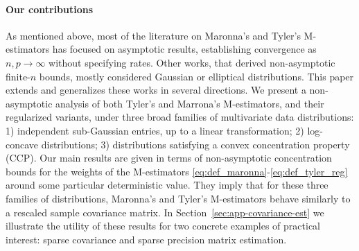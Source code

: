 \documentclass[times,sort&compress,3p]{elsarticle}
\newcommand{\Revision}[1]{{#1}}
\begin{document}
\paragraph{Our contributions}
As mentioned above, 
most of the literature on Maronna's and Tyler's M-estimators has focused on asymptotic results,  establishing convergence as $n,p\to\infty$
without specifying rates.
Other works,
that derived non-asymptotic finite-$n$ bounds,  mostly considered Gaussian or elliptical distributions. 
This paper extends and
generalizes these works in several directions. 
We present a non-asymptotic analysis of both Tyler's and Marrona's M-estimators, and their regularized variants, 
under three broad families of multivariate data distributions: 1) independent sub-Gaussian entries, up to a linear transformation; 2) log-concave distributions; 3) distributions satisfying a convex concentration property (CCP).   
\Revision{Our main results are given in terms of non-asymptotic concentration bounds for the weights of the M-estimators \eqref{eq:def_maronna}-\eqref{eq:def_tyler_reg}
around some particular deterministic value. They imply that 
for these three families of distributions,
Maronna's and Tyler's M-estimators behave similarly to a rescaled sample covariance matrix. In Section~\ref{sec:app-covariance-est} we illustrate the utility of these results for two concrete examples of practical interest: sparse covariance and sparse precision matrix estimation. 
}
\end{document}
